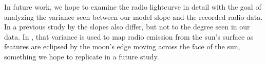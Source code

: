 In future work, we hope to examine the radio lightcurve in detail with the goal of analyzing the variance seen between our model slope and the recorded radio data. In a previous study by \cite{messerotti_radio_2000} the slopes also differ, but not to the degree seen in our data.
In \cite{messerotti_radio_2000}, that variance is used to map radio emission from the sun's surface as features are eclipsed by the moon's edge moving across the face of the sun, something we hope to replicate in a future study.
